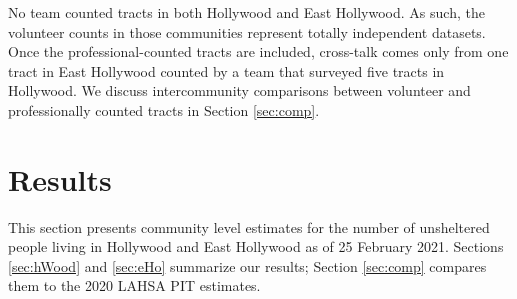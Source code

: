 \documentclass[11pt,twocolumn]{article}
\def\bfr{\bf\color{red}}
\begin{document}


No team counted tracts in both Hollywood and East Hollywood. As such, the volunteer counts
in those communities represent totally independent datasets. Once the professional-counted tracts are 
included, cross-talk comes only from one tract in East Hollywood counted by a team that surveyed five 
tracts in Hollywood. We discuss intercommunity comparisons between volunteer and professionally 
counted tracts in Section \ref{sec:comp}.

%
%


\section{Results}
\label{sec:results}

This section presents community level estimates for the number of unsheltered people living in
Hollywood and East Hollywood as of 25 February 2021. Sections \ref{sec:hWood} and \ref{sec:eHo} 
summarize our results; Section \ref{sec:comp} compares them to the 2020 LAHSA PIT estimates.
\end{document}
